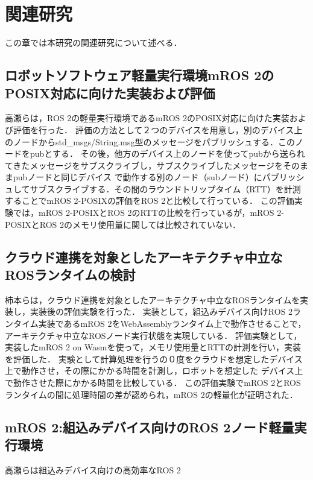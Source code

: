 \chapter{関連研究}
この章では本研究の関連研究について述べる．
\section{ロボットソフトウェア軽量実行環境mROS 2のPOSIX対応に向けた実装および評価}
高瀬らは，ROS 2の軽量実行環境であるmROS 2のPOSIX対応に向けた実装および評価を行った．
評価の方法として２つのデバイスを用意し，別のデバイス上のノードからstd\_msgs/String.msg型のメッセージをパブリッシュする．このノードをpubとする．
その後，他方のデバイス上のノードを使ってpubから送られてきたメッセージをサブスクライブし，サブスクライブしたメッセージをそのままpubノードと同じデバイス
で動作する別のノード（subノード）にパブリッシュしてサブスクライブする．その間のラウンドトリップタイム（RTT）を計測することでmROS 2-POSIXの評価をROS 2と比較して行っている．
この評価実験では，mROS 2-POSIXとROS 2のRTTの比較を行っているが，mROS 2-POSIXとROS 2のメモリ使用量に関しては比較されていない．
\section{クラウド連携を対象としたアーキテクチャ中立なROSランタイムの検討}
柿本らは，クラウド連携を対象としたアーキテクチャ中立なROSランタイムを実装し，実装後の評価実験を行った．
実装として，組込みデバイス向けROS 2ランタイム実装であるmROS 2をWebAssemblyランタイム上で動作させることで，アーキテクチャ中立なROSノード実行状態を実現している．
評価実験として，実装したmROS 2 on Wasmを使って，メモリ使用量とRTTの計測を行い，実装を評価した．
実験として計算処理を行うの０度をクラウドを想定したデバイス上で動作させ，その際にかかる時間を計測し，ロボットを想定した
デバイス上で動作させた際にかかる時間を比較している．
この評価実験でmROS 2とROS ランタイムの間に処理時間の差が認められ，mROS 2の軽量化が証明された．
\section{mROS 2:組込みデバイス向けのROS 2ノード軽量実行環境}
高瀬らは組込みデバイス向けの高効率なROS 2